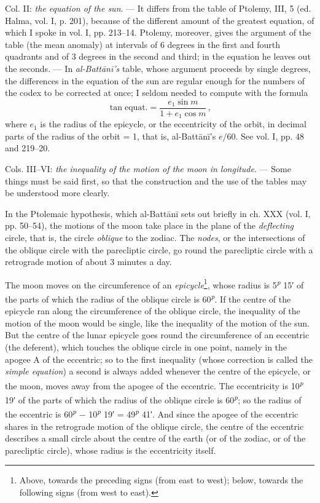\documentclass[11pt]{article}
\begin{document}
\par Col. II: \emph{the equation of the sun}. — It differs from the table of Ptolemy, III, 5 (ed. Halma, vol. I, p. 201), because of the different amount of the greatest equation, of which I spoke in vol. I, pp. 213–14. Ptolemy, moreover, gives the argument of the table (the mean anomaly) at intervals of 6 degrees in the first and fourth quadrants and of 3 degrees in the second and third; in the equation he leaves out the seconds. — In \emph{al-Battānī's} table, whose argument proceeds by single degrees, the differences in the equation of the sun are regular enough for the numbers of the codex to be corrected at once; I seldom needed to compute with the formula \[ \tan \text{equat.} = \frac{e_1 \sin m}{1 + e_1 \cos m}\,, \] where $e_1$ is the radius of the epicycle, or the eccentricity of the orbit, in decimal parts of the radius of the orbit = 1, that is, al-Battānī's $e/60$. See vol. I, pp. 48 and 219–20.\par
\par Cols. III–VI: \emph{the inequality of the motion of the moon in longitude}. — Some things must be said first, so that the construction and the use of the tables may be understood more clearly.\par
\par In the Ptolemaic hypothesis, which al-Battānī sets out briefly in ch. XXX (vol. I, pp. 50–54), the motions of the moon take place in the plane of the \emph{deflecting} circle, that is, the circle \emph{oblique} to the zodiac. The \emph{nodes}, or the intersections of the oblique circle with the parecliptic circle, go round the parecliptic circle with a retrograde motion of about 3 minutes a day.\par
\par The moon moves on the circumference of an \emph{epicycle}\footnote{Above, towards the preceding signs (from east to west); below, towards the following signs (from west to east).}, whose radius is 5\textsuperscript{\itshape p} 15′ of the parts of which the radius of the oblique circle is 60\textsuperscript{\itshape p}. If the centre of the epicycle ran along the circumference of the oblique circle, the inequality of the motion of the moon would be single, like the inequality of the motion of the sun. But the centre of the lunar epicycle goes round the circumference of an eccentric (the deferent), which touches the oblique circle in one point, namely in the apogee A of the eccentric; so to the first inequality (whose correction is called the \emph{simple equation}) a second is always added whenever the centre of the epicycle, or the moon, moves away from the apogee of the eccentric. The eccentricity is 10\textsuperscript{\itshape p} 19′ of the parts of which the radius of the oblique circle is 60\textsuperscript{\itshape p}; so the radius of the eccentric is 60\textsuperscript{\itshape p} − 10\textsuperscript{\itshape p} 19′ = 49\textsuperscript{\itshape p} 41′. And since the apogee of the eccentric shares in the retrograde motion of the oblique circle, the centre of the eccentric describes a small circle about the centre of the earth (or of the zodiac, or of the parecliptic circle), whose radius is the eccentricity itself.\par
\end{document}

